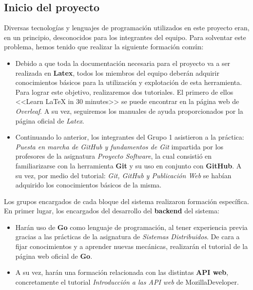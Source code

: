 \documentclass[11pt, a4paper, titlepage]{article}
\begin{document}
\subsection{Inicio del proyecto}

Diversas tecnologías y lenguajes de programación utilizados en este proyecto eran, en un principio, desconocidos para los integrantes del equipo. Para solventar este problema, hemos tenido que realizar la siguiente formación común:

\begin{itemize}

\item Debido a que toda la documentación necesaria para el proyecto va a ser realizada en \textbf{Latex}, todos los miembros del equipo deberán adquirir conocimientos básicos para la utilización y explotación de esta herramienta. Para lograr este objetivo, realizaremos dos tutoriales. El primero de ellos <<Learn LaTeX in 30 minutes>>\cite{latextutorial1} se puede encontrar en la página web de \textit{Overleaf}. A su vez, seguiremos los manuales de ayuda proporcionados por la página oficial de \textit{Latex}\cite{latextutorial2}. 

\item Continuando lo anterior, los integrantes del Grupo 1 asistieron a la práctica: \textit{Puesta en marcha de GitHub y fundamentos de Git} impartida por los profesores de la asignatura \textit{Proyecto Software}, la cual consistió en familiarizarse con la herramienta \textbf{Git} y su uso en conjunto con \textbf{GitHub}. A su vez, por medio del tutorial: \textit{Git, GitHub y Publicación Web}\cite{githubtutorial} se habían adquirido los conocimientos básicos de la misma.

\end{itemize}

Los grupos encargados de cada bloque del sistema realizaron formación específica. En primer lugar, los encargados del desarrollo del \textbf{backend} del sistema:

\begin{itemize}

\item Harán uso de \textbf{Go} como lenguaje de programación, al tener experiencia previa gracias a las prácticas de la asignatura de \textit{Sistemas Distribuidos}. De cara a fijar conocimientos y a aprender nuevas mecánicas, realizarán el tutorial de la página web oficial de \textbf{Go}. 

\item A su vez, harán una formación relacionada con las distintas \textbf{API web}, concretamente el tutorial \textit{Introducción a las API web} de MozillaDeveloper\cite{apisweb}.

\end{itemize}
\end{document}
